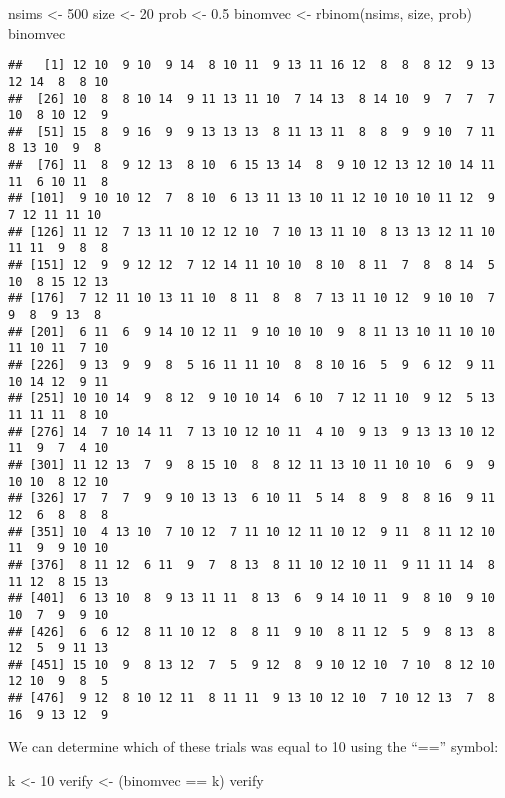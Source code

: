 \documentclass[
]{book}
\newenvironment{Shaded}{\begin{snugshade}}{\end{snugshade}}
\newcommand{\DecValTok}[1]{\textcolor[rgb]{0.00,0.00,0.81}{#1}}
\newcommand{\FloatTok}[1]{\textcolor[rgb]{0.00,0.00,0.81}{#1}}
\newcommand{\FunctionTok}[1]{\textcolor[rgb]{0.00,0.00,0.00}{#1}}
\newcommand{\NormalTok}[1]{#1}
\newcommand{\OtherTok}[1]{\textcolor[rgb]{0.56,0.35,0.01}{#1}}
\newcommand{\SpecialCharTok}[1]{\textcolor[rgb]{0.00,0.00,0.00}{#1}}
\begin{document}
\begin{Shaded}
\begin{Highlighting}[]
\NormalTok{nsims }\OtherTok{\textless{}{-}} \DecValTok{500}
\NormalTok{size }\OtherTok{\textless{}{-}} \DecValTok{20}
\NormalTok{prob }\OtherTok{\textless{}{-}} \FloatTok{0.5}
\NormalTok{binomvec }\OtherTok{\textless{}{-}} \FunctionTok{rbinom}\NormalTok{(nsims, size, prob)}
\NormalTok{binomvec}
\end{Highlighting}
\end{Shaded}

\begin{verbatim}
##   [1] 12 10  9 10  9 14  8 10 11  9 13 11 16 12  8  8  8 12  9 13 12 14  8  8 10
##  [26] 10  8  8 10 14  9 11 13 11 10  7 14 13  8 14 10  9  7  7  7 10  8 10 12  9
##  [51] 15  8  9 16  9  9 13 13 13  8 11 13 11  8  8  9  9 10  7 11  8 13 10  9  8
##  [76] 11  8  9 12 13  8 10  6 15 13 14  8  9 10 12 13 12 10 14 11 11  6 10 11  8
## [101]  9 10 10 12  7  8 10  6 13 11 13 10 11 12 10 10 10 11 12  9  7 12 11 11 10
## [126] 11 12  7 13 11 10 12 12 10  7 10 13 11 10  8 13 13 12 11 10 11 11  9  8  8
## [151] 12  9  9 12 12  7 12 14 11 10 10  8 10  8 11  7  8  8 14  5 10  8 15 12 13
## [176]  7 12 11 10 13 11 10  8 11  8  8  7 13 11 10 12  9 10 10  7  9  8  9 13  8
## [201]  6 11  6  9 14 10 12 11  9 10 10 10  9  8 11 13 10 11 10 10 11 10 11  7 10
## [226]  9 13  9  9  8  5 16 11 11 10  8  8 10 16  5  9  6 12  9 11 10 14 12  9 11
## [251] 10 10 14  9  8 12  9 10 10 14  6 10  7 12 11 10  9 12  5 13 11 11 11  8 10
## [276] 14  7 10 14 11  7 13 10 12 10 11  4 10  9 13  9 13 13 10 12 11  9  7  4 10
## [301] 11 12 13  7  9  8 15 10  8  8 12 11 13 10 11 10 10  6  9  9 10 10  8 12 10
## [326] 17  7  7  9  9 10 13 13  6 10 11  5 14  8  9  8  8 16  9 11 12  6  8  8  8
## [351] 10  4 13 10  7 10 12  7 11 10 12 11 10 12  9 11  8 11 12 10 11  9  9 10 10
## [376]  8 11 12  6 11  9  7  8 13  8 11 10 12 10 11  9 11 11 14  8 11 12  8 15 13
## [401]  6 13 10  8  9 13 11 11  8 13  6  9 14 10 11  9  8 10  9 10 10  7  9  9 10
## [426]  6  6 12  8 11 10 12  8  8 11  9 10  8 11 12  5  9  8 13  8 12  5  9 11 13
## [451] 15 10  9  8 13 12  7  5  9 12  8  9 10 12 10  7 10  8 12 10 12 10  9  8  5
## [476]  9 12  8 10 12 11  8 11 11  9 13 10 12 10  7 10 12 13  7  8 16  9 13 12  9
\end{verbatim}

We can determine which of these trials was equal to 10 using the ``=='' symbol:

\begin{Shaded}
\begin{Highlighting}[]
\NormalTok{k }\OtherTok{\textless{}{-}} \DecValTok{10}
\NormalTok{verify }\OtherTok{\textless{}{-}}\NormalTok{ (binomvec }\SpecialCharTok{==}\NormalTok{ k)}
\NormalTok{verify}
\end{Highlighting}
\end{Shaded}
\end{document}
